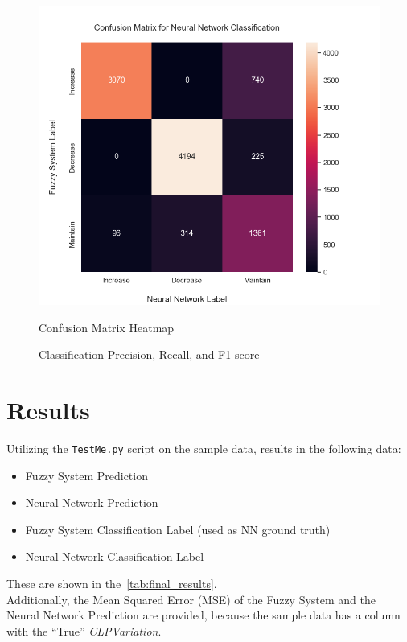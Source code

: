 \documentclass[titlepage]{article}
\begin{document}
\begin{figure}[H]
\centering
\begin{minipage}{0.55\textwidth}
\includegraphics[width=\textwidth]{../images/classification/confusion_heatmap}
\caption{Confusion Matrix Heatmap}
\label{fig:confusion_matrix_heatmap}
\end{minipage}
\qquad
\begin{minipage}{0.4\textwidth}
\begin{table}[H]
    \centering
    
    \caption{Classification  Precision, Recall, and F1-score}
    \label{tab:classification_scores}
\end{table}
\end{minipage}

\end{figure}



\newpage
\part{Results}

Utilizing the \texttt{TestMe.py} script on the sample data, results in the following data:
\begin{itemize}
    \item Fuzzy System Prediction
    \item Neural Network Prediction
    \item Fuzzy System Classification Label (used as NN ground truth)
    \item Neural Network Classification Label
\end{itemize}
These are shown in the~\cref{tab:final_results}. \\
Additionally, the Mean Squared Error (MSE) of the Fuzzy System and the Neural Network Prediction are provided,
because the sample data has a column with the ``True'' \emph{CLPVariation}.
\end{document}
